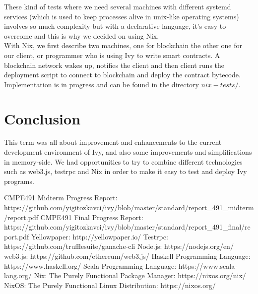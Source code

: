 \documentclass{article}
\begin{document}
These kind of tests where we need several machines with different systemd services (which is used to keep processes alive in unix-like operating systems) involves so much complexity but with a declarative language, it's easy to overcome and this is why we decided on using Nix. \\

With Nix, we first describe two machines, one for blockchain the other one for our client, or programmer who is using Ivy to write smart contracts. A blockchain network wakes up, notifies the client and then client runs the deployment script to connect to blockchain and deploy the contract bytecode. \\

Implementation is in progress and can be found in the directory $nix-tests/$.

\section{Conclusion}
This term was all about improvement and enhancements to the current development environment of Ivy, and also some improvements and simplifications in memory-side. We had opportunities to try to combine different technologies such as web3.js, testrpc and Nix in order to make it easy to test and deploy Ivy programs.
\newpage
\begin{thebibliography}{2}
  CMPE491 Midterm Progress Report:
  \\ https://github.com/yigitozkavci/ivy/blob/master/standard/report\_491\_midterm/report.pdf
  CMPE491 Final Progress Report:
  \\ https://github.com/yigitozkavci/ivy/blob/master/standard/report\_491\_final/report.pdf
  Yellowpaper: http://yellowpaper.io/
  Testrpc: https://github.com/trufflesuite/ganache-cli
  Node.js: https://nodejs.org/en/
  web3.js: https://github.com/ethereum/web3.js/
  Haskell Programming Language: https://www.haskell.org/
  Scala Programming Language: https://www.scala-lang.org/
  Nix: The Purely Functional Package Manager: https://nixos.org/nix/
  NixOS: The Purely Functional Linux Distribution: https://nixos.org/
\end{thebibliography}
\end{document}
